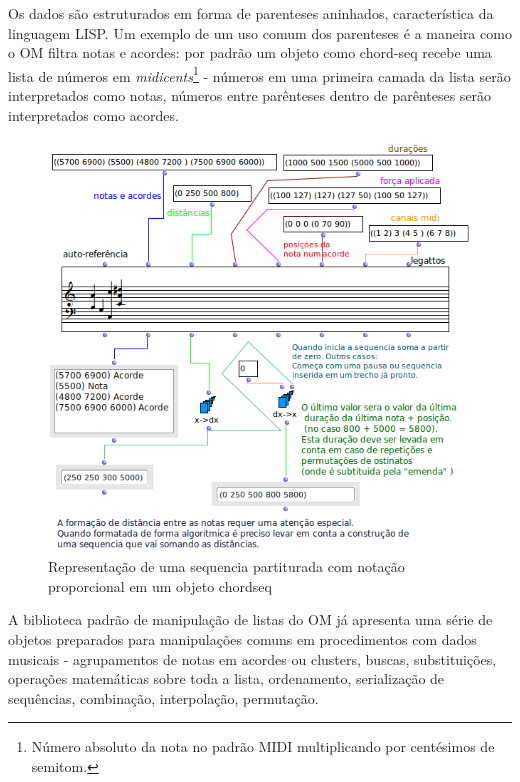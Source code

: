 \documentclass[
	12pt,				%
	openright,			%
	twoside,			%
	a4paper,			%
	english,			%
	french,				%
	spanish,			%
	brazil				%
	]{abntex2}
\begin{document}
Os dados são estruturados em forma de parenteses aninhados, característica da linguagem LISP. Um exemplo de um uso comum dos parenteses é a maneira como o OM filtra notas e acordes: por padrão um objeto como chord-seq recebe uma lista de números em \textit{midicents}\footnote{Número absoluto da nota no padrão MIDI multiplicando por centésimos de semitom.} - números em uma primeira camada da lista serão interpretados como notas, números entre parênteses dentro de parênteses serão interpretados como acordes.


\begin{figure}[!h]
	\caption{\label{fig_grafico}Representação de uma sequencia partiturada com notação proporcional em um objeto chord\-seq }
	\begin{center}
	    \includegraphics[scale=0.8]{OMPD/chord-seq-sem-titulo.png}
	\end{center}
\end{figure}

A biblioteca padrão de manipulação de listas do OM já apresenta uma série de objetos preparados para manipulações comuns em procedimentos com dados musicais - agrupamentos de notas em acordes ou clusters, buscas, substituições, operações matemáticas sobre toda a lista, ordenamento, serialização  de sequências, combinação, interpolação, permutação. 
\end{document}
